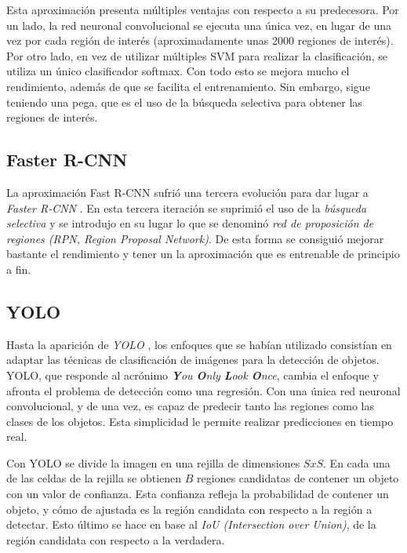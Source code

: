Esta aproximación presenta múltiples ventajas con respecto a su predecesora. Por un lado, la red neuronal convolucional se ejecuta una única vez, en lugar de una vez por cada región de interés (aproximadamente unas 2000 regiones de interés). Por otro lado, en vez de utilizar múltiples SVM para realizar la clasificación, se utiliza un único clasificador softmax. Con todo esto se mejora mucho el rendimiento, además de que se facilita el entrenamiento. Sin embargo, sigue teniendo una pega, que es el uso de la búsqueda selectiva para obtener las regiones de interés.

\subsection*{Faster R-CNN}

La aproximación Fast R-CNN sufrió una tercera evolución para dar lugar a \textit{Faster R-CNN} \cite{s2_stateofart_fasterrcnn}. En esta tercera iteración se suprimió el uso de la \textit{búsqueda selectiva} y se introdujo en su lugar lo que se denominó \textit{red de proposición de regiones (RPN, Region Proposal Network)}. De esta forma se consiguió mejorar bastante el rendimiento y tener un la aproximación que es entrenable de principio a fin.

\subsection*{YOLO}

Hasta la aparición de \textit{YOLO} \cite{s2_stateofart_yolo}, los enfoques que se habían utilizado consistían en adaptar las técnicas de clasificación de imágenes para la detección de objetos. YOLO, que responde al acrónimo \textit{\textbf{Y}ou \textbf{O}nly \textbf{L}ook \textbf{O}nce}, cambia el enfoque y afronta el problema de detección como una regresión. Con una única red neuronal convolucional, y de una vez, es capaz de predecir tanto las regiones como las clases de los objetos. Esta simplicidad le permite realizar predicciones en tiempo real.

Con YOLO se divide la imagen en una rejilla de dimensiones $SxS$. En cada una de las celdas de la rejilla se obtienen $B$ regiones candidatas de contener un objeto con un valor de confianza. Esta confianza refleja la probabilidad de contener un objeto, y cómo de ajustada es la región candidata con respecto a la región a detectar. Esto último se hace en base al \textit{IoU (Intersection over Union)}, de la región candidata con respecto a la verdadera.

